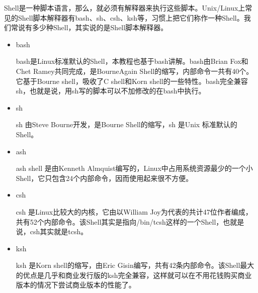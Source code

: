 Shell是一种脚本语言，那么，就必须有解释器来执行这些脚本。Unix/Linux上常见的Shell脚本解释器有bash、sh、csh、ksh等，习惯上把它们称作一种Shell。我们常说有多少种Shell，其实说的是Shell脚本解释器。
\begin{itemize}
\item bash

bash是Linux标准默认的Shell，本教程也基于bash讲解。bash由Brian Fox和Chet Ramey共同完成，是BourneAgain Shell的缩写，内部命令一共有40个。它基于Bourne shell，吸收了C shell和Korn shell的一些特性。bash完全兼容sh，也就是说，用sh写的脚本可以不加修改的在bash中执行。

\item sh

sh 由Steve Bourne开发，是Bourne Shell的缩写，sh 是Unix 标准默认的Shell。

\item ash

ash shell 是由Kenneth Almquist编写的，Linux中占用系统资源最少的一个小Shell，它只包含24个内部命令，因而使用起来很不方便。

\item csh

csh 是Linux比较大的内核，它由以William Joy为代表的共计47位作者编成，共有52个内部命令。该Shell其实是指向/bin/tcsh这样的一个Shell，也就是说，csh其实就是tcsh。

\item ksh

ksh 是Korn shell的缩写，由Eric Gisin编写，共有42条内部命令。该Shell最大的优点是几乎和商业发行版的ksh完全兼容，这样就可以在不用花钱购买商业版本的情况下尝试商业版本的性能了。
\end{itemize}



